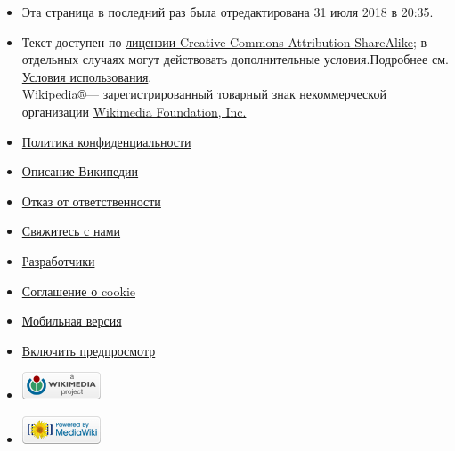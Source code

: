 \documentclass[a4paper,11pt]{article}
\begin{document}
\begin{itemize}
	\item  Эта страница в последний раз была отредактирована 31 июля 2018 в 20:35.
	\item Текст доступен по \href{https://ru.wikipedia.org/wiki/%D0%92%D0%B8%D0%BA%D0%B8%D0%BF%D0%B5%D0%B4%D0%B8%D1%8F:%D0%A2%D0%B5%D0%BA%D1%81%D1%82_%D0%BB%D0%B8%D1%86%D0%B5%D0%BD%D0%B7%D0%B8%D0%B8_Creative_Commons_Attribution-ShareAlike_3.0_Unported}{лицензии Creative Commons Attribution-ShareAlike}\href{https://creativecommons.org/licenses/by-sa/3.0/}{}; в отдельных случаях могут действовать дополнительные условия.Подробнее см. \href{https://foundation.wikimedia.org/wiki/Terms_of_Use/ru}{Условия использования}.
\\Wikipedia®\nolinebreak— зарегистрированный товарный знак некоммерческой организации \href{https://wikimediafoundation.org/}{Wikimedia Foundation, Inc.}
\end{itemize}
\begin{itemize}
	\item \href{https://meta.wikimedia.org/wiki/Privacy_policy/ru}{Политика конфиденциальности}
	\item \href{https://ru.wikipedia.org/wiki/%D0%92%D0%B8%D0%BA%D0%B8%D0%BF%D0%B5%D0%B4%D0%B8%D1%8F:%D0%9E%D0%BF%D0%B8%D1%81%D0%B0%D0%BD%D0%B8%D0%B5}{Описание Википедии}
	\item \href{https://ru.wikipedia.org/wiki/%D0%92%D0%B8%D0%BA%D0%B8%D0%BF%D0%B5%D0%B4%D0%B8%D1%8F:%D0%9E%D1%82%D0%BA%D0%B0%D0%B7_%D0%BE%D1%82_%D0%BE%D1%82%D0%B2%D0%B5%D1%82%D1%81%D1%82%D0%B2%D0%B5%D0%BD%D0%BD%D0%BE%D1%81%D1%82%D0%B8}{Отказ от ответственности}
	\item \href{https://ru.wikipedia.org/wiki/%D0%92%D0%B8%D0%BA%D0%B8%D0%BF%D0%B5%D0%B4%D0%B8%D1%8F:%D0%9A%D0%BE%D0%BD%D1%82%D0%B0%D0%BA%D1%82%D1%8B}{Свяжитесь с нами}
	\item \href{https://www.mediawiki.org/wiki/Special:MyLanguage/How_to_contribute}{Разработчики}
	\item \href{https://foundation.wikimedia.org/wiki/Cookie_statement}{Соглашение о cookie}
	\item \href{https://ru.m.wikipedia.org/w/index.php?title=Xeon&amp;mobileaction=toggle_view_mobile}{Мобильная версия}
	\item \hyperlink{}{Включить предпросмотр}
\end{itemize}
\begin{itemize}
	\item \href{https://wikimediafoundation.org/}{
\includegraphics{xeon_files/wikimedia-button.png}}
	\item \href{https://www.mediawiki.org/}{
\includegraphics{xeon_files/poweredby_mediawiki_88x31.png}}
\end{itemize}
\end{document}
